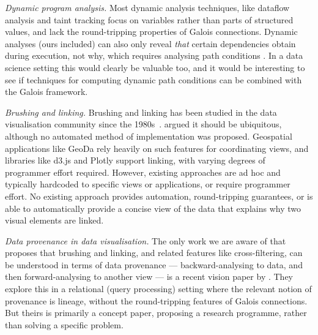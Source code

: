 \emph{Dynamic program analysis.} Most dynamic analysis techniques, like dataflow analysis \cite{chen88,reps95} and taint tracking \cite{reps95} focus on variables rather than parts of structured values, and lack the round-tripping properties of Galois connections. Dynamic analyses (ours included) can also only reveal \emph{that} certain dependencies obtain during execution, not why, which requires analysing path conditions \cite{hammer06}. In a data science setting this would clearly be valuable too, and it would be interesting to see if techniques for computing dynamic path conditions can be combined with the Galois framework.

\emph{Brushing and linking.} Brushing and linking has been studied in the data visualisation community since the 1980s~\cite{mcdonald82,becker87}. \citet{roberts06} argued it should be ubiquitous, although no automated method of implementation was proposed. Geospatial applications like GeoDa \cite{anselin06} rely heavily on such features for coordinating views, and libraries like d3.js and Plotly support linking, with varying degrees of programmer effort required. However, existing approaches are ad hoc and typically hardcoded to specific views or applications, or require programmer effort. No existing approach provides automation, round-tripping guarantees, or is able to automatically provide a concise view of the data that explains why two visual elements are linked.

\emph{Data provenance in data visualisation.} The only work we are aware of that proposes that brushing and linking, and related features like cross-filtering, can be understood in terms of data provenance --- backward-analysing to data, and then forward-analysing to another view --- is a recent vision paper by \citet{psallidas18}. They explore this in a relational (query processing) setting where the relevant notion of provenance is lineage, without the round-tripping features of Galois connections. But theirs is primarily a concept paper, proposing a research programme, rather than solving a specific problem.
